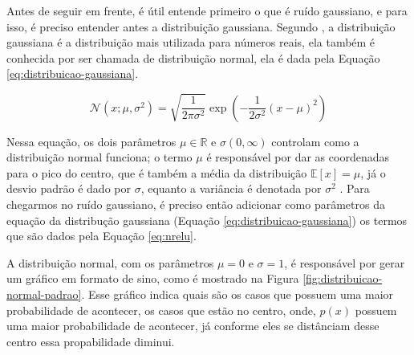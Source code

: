 Antes de seguir em frente, é útil entende primeiro o que é ruído gaussiano, e para isso, é preciso entender antes a distribuição gaussiana. Segundo \textcite{DeepLearningBook}, a distribuição gaussiana é a distribuição mais utilizada para números reais, ela também é conhecida por ser chamada de distribuição normal, ela é dada pela Equação \ref{eq:distribuicao-gaussiana}.

\begin{equation}
    \mathcal{N}(x; \mu, \sigma^2) = \sqrt{\frac{1}{2\pi\sigma^2}} \exp\left( -\frac{1}{2\sigma^2}(x - \mu)^2 \right)
    \label{eq:distribuicao-gaussiana}
\end{equation}

Nessa equação, os dois parâmetros $\mu \in \mathbb{R}$ e $\sigma (0, \infty)$ controlam como a distribuição normal funciona; o termo $\mu$ é responsável por dar as coordenadas para o pico do centro, que é também a média da distribuição $\mathbb{E}[x] = \mu$, já o desvio padrão é dado por $\sigma$, equanto a variância é denotada por $\sigma^2$ \parencite{DeepLearningBook}. Para chegarmos no ruído gaussiano, é preciso então adicionar como parâmetros da equação da distribução gaussiana (Equação \ref{eq:distribuicao-gaussiana}) os termos que são dados pela Equação \ref{eq:nrelu}. 

A distribuição normal, com os parâmetros $\mu = 0$ e $\sigma=1$, é responsável por gerar um gráfico em formato de sino, como é mostrado na Figura \ref{fig:distribuicao-normal-padrao}. Esse gráfico indica quais são os casos que possuem uma maior probabilidade de acontecer, os casos que estão no centro, onde, $p(x)$ possuem uma maior probabilidade de acontecer, já conforme eles se distânciam desse centro essa propabilidade diminui.

